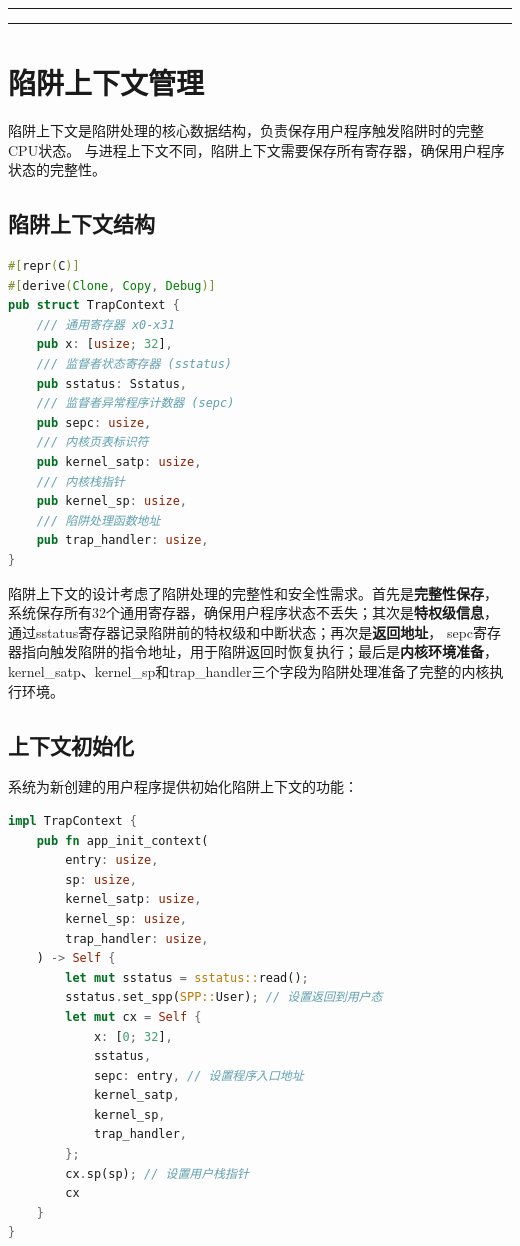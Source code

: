 \noindent
\rule{0.4\textwidth}{0.4pt}
\hfill
{}
\hfill
\rule{0.4\textwidth}{0.4pt}

\section{陷阱上下文管理}

陷阱上下文是陷阱处理的核心数据结构，负责保存用户程序触发陷阱时的完整CPU状态。
与进程上下文不同，陷阱上下文需要保存所有寄存器，确保用户程序状态的完整性。

\subsection{陷阱上下文结构}

\begin{lstlisting}[language=Rust,caption={陷阱上下文结构}, label={lst:trap-context}]
#[repr(C)]
#[derive(Clone, Copy, Debug)]
pub struct TrapContext {
    /// 通用寄存器 x0-x31
    pub x: [usize; 32],
    /// 监督者状态寄存器 (sstatus)
    pub sstatus: Sstatus,
    /// 监督者异常程序计数器 (sepc)
    pub sepc: usize,
    /// 内核页表标识符
    pub kernel_satp: usize,
    /// 内核栈指针
    pub kernel_sp: usize,
    /// 陷阱处理函数地址
    pub trap_handler: usize,
}
\end{lstlisting}

陷阱上下文的设计考虑了陷阱处理的完整性和安全性需求。首先是\textbf{完整性保存}，
系统保存所有32个通用寄存器，确保用户程序状态不丢失；其次是\textbf{特权级信息}，
通过sstatus寄存器记录陷阱前的特权级和中断状态；再次是\textbf{返回地址}，
sepc寄存器指向触发陷阱的指令地址，用于陷阱返回时恢复执行；最后是\textbf{内核环境准备}，
kernel\_satp、kernel\_sp和trap\_handler三个字段为陷阱处理准备了完整的内核执行环境。

\subsection{上下文初始化}

系统为新创建的用户程序提供初始化陷阱上下文的功能：

\begin{lstlisting}[language=Rust,caption={陷阱上下文初始化}, label={lst:trap-context-init}]
impl TrapContext {
    pub fn app_init_context(
        entry: usize,
        sp: usize,
        kernel_satp: usize,
        kernel_sp: usize,
        trap_handler: usize,
    ) -> Self {
        let mut sstatus = sstatus::read();
        sstatus.set_spp(SPP::User); // 设置返回到用户态
        let mut cx = Self {
            x: [0; 32],
            sstatus,
            sepc: entry, // 设置程序入口地址
            kernel_satp,
            kernel_sp,
            trap_handler,
        };
        cx.sp(sp); // 设置用户栈指针
        cx
    }
}
\end{lstlisting}

